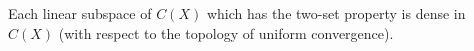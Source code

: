 Each linear subspace of $C(X)$ which has the two-set property is dense in $C(X)$ (with respect to the topology of uniform convergence).
